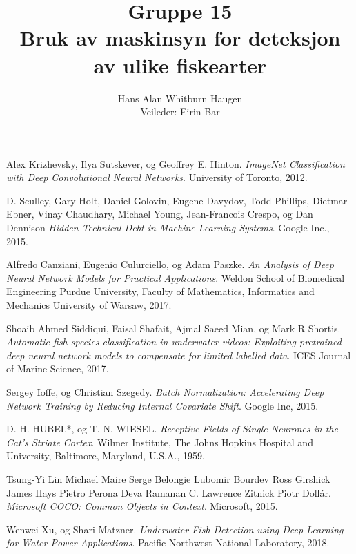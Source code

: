 \documentclass[11ot]{article}
\title{Gruppe 15\\Bruk av maskinsyn for deteksjon av ulike fiskearter}
\author{Hans Alan Whitburn Haugen\\Veileder: Eirin Bar}
\begin{document}

\newpage

\newpage

\newpage

\tableofcontents
\clearpage
{}
\setcounter{page}{1}








\begin{thebibliography}{9}


Alex Krizhevsky, Ilya Sutskever, og Geoffrey E. Hinton. 
\textit{ImageNet Classification with Deep Convolutional Neural Networks}. 
University of Toronto, 2012.

D. Sculley, Gary Holt, Daniel Golovin, Eugene Davydov, Todd Phillips, Dietmar Ebner, Vinay Chaudhary, Michael Young, Jean-Francois Crespo, og Dan Dennison 
\textit{Hidden Technical Debt in Machine Learning Systems}. 
Google Inc., 2015.

Alfredo Canziani, Eugenio Culurciello, og Adam Paszke. 
\textit{An Analysis of Deep Neural Network Models for Practical Applications}. 
Weldon School of Biomedical Engineering Purdue University, Faculty of Mathematics, Informatics and Mechanics University of Warsaw, 2017.

Shoaib Ahmed Siddiqui, Faisal Shafait, Ajmal Saeed Mian, og Mark R Shortis. 
\textit{Automatic fish species classification in underwater videos: Exploiting pretrained deep neural network models to compensate for limited labelled data}. 
ICES Journal of Marine Science, 2017.

Sergey Ioffe, og Christian Szegedy. 
\textit{Batch Normalization: Accelerating Deep Network Training by Reducing Internal Covariate Shift}. 
Google Inc, 2015.

D. H. HUBEL*, og T. N. WIESEL. 
\textit{Receptive Fields of Single Neurones in the Cat's Striate Cortex}. 
 Wilmer Institute, The Johns Hopkins Hospital and University, Baltimore, Maryland, U.S.A., 1959.

Tsung-Yi Lin Michael Maire Serge Belongie Lubomir Bourdev Ross Girshick James Hays Pietro Perona Deva Ramanan C. Lawrence Zitnick Piotr Dollár. 
\textit{Microsoft COCO: Common Objects in Context}. 
Microsoft, 2015.

Wenwei Xu, og Shari Matzner. 
\textit{Underwater Fish Detection using Deep Learning for Water Power Applications}. 
Pacific Northwest National Laboratory, 2018.


\end{thebibliography}
\end{document}
